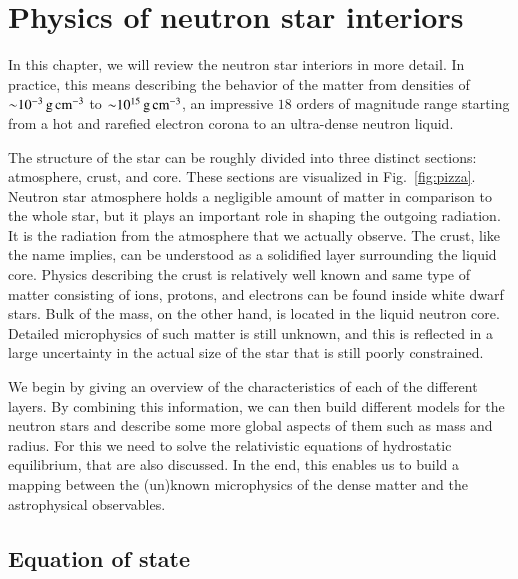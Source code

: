 \chapter{Physics of neutron star interiors} 

In this chapter, we will review the neutron star interiors in more detail.
In practice, this means describing the behavior of the matter from densities of $\mathord{\sim} 10^{-3} \, \mathrm{g}\,\mathrm{cm}^{-3}$ to $\mathord{\sim} 10^{15} \, \mathrm{g}\,\mathrm{cm}^{-3}$, an impressive $18$ orders of magnitude range starting from a hot and rarefied electron corona to an ultra-dense neutron liquid.

The structure of the star can be roughly divided into three distinct sections: atmosphere, crust, and core.
These sections are visualized in Fig.~\ref{fig:pizza}.
Neutron star atmosphere holds a negligible amount of matter in comparison to the whole star, but it plays an important role in shaping the outgoing radiation.
It is the radiation from the atmosphere that we actually observe.
The crust, like the name implies, can be understood as a solidified layer surrounding the liquid core.
Physics describing the crust is relatively well known and same type of matter consisting of ions, protons, and electrons can be found inside white dwarf stars.
Bulk of the mass, on the other hand, is located in the liquid neutron core.
Detailed microphysics of such matter is still unknown, and this is reflected in a large uncertainty in the actual size of the star that is still poorly constrained.

We begin by giving an overview of the characteristics of each of the different layers.
By combining this information, we can then build different models for the neutron stars and describe some more global aspects of them such as mass and radius.
For this we need to solve the relativistic equations of hydrostatic equilibrium, that are also discussed.
In the end, this enables us to build a mapping between the (un)known microphysics of the dense matter and the astrophysical observables.


\section{Equation of state}
%
%
%
%


